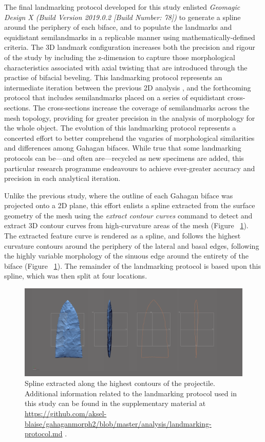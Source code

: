 \documentclass[review]{elsarticle}
\begin{document}
The final landmarking protocol developed for this study \citep{RN20850} enlisted \textit{Geomagic Design X (Build Version 2019.0.2 [Build Number: 78])} to generate a spline around the periphery of each biface, and to populate the landmarks and equidistant semilandmarks in a replicable manner using mathematically-defined criteria. The 3D landmark configuration increases both the precision and rigour of the study by including the z-dimension to capture those morphological characteristics associated with axial twisting that are introduced through the practise of bifacial beveling. This landmarking protocol represents an intermediate iteration between the previous 2D analysis \citep{RN11783}, and the forthcoming protocol that includes semilandmarks placed on a series of equidistant cross-sections. The cross-sections increase the coverage of semilandmarks across the mesh topology, providing for greater precision in the analysis of morphology for the whole object. The evolution of this landmarking protocol represents a concerted effort to better comprehend the vagaries of morphological similarities and differences among Gahagan bifaces. While true that some landmarking protocols can be—and often are—recycled as new specimens are added, this particular research programme endeavours to achieve ever-greater accuracy and precision in each analytical iteration.

Unlike the previous study, where the outline of each Gahagan biface was projected onto a 2D plane, this effort enlists a spline extracted from the surface geometry of the mesh using the \textit{extract contour curves} command to detect and extract 3D contour curves from high-curvature areas of the mesh (Figure ~\ref{fig:fig07}). The extracted feature curve is rendered as a spline, and follows the highest curvature contours around the periphery of the lateral and basal edges, following the highly variable morphology of the sinuous edge around the entirety of the biface (Figure ~\ref{fig:fig07}). The remainder of the landmarking protocol is based upon this spline, which was then split at four locations.

\begin{figure}[ht]\centering
\includegraphics[width=\linewidth]{fig07.png}
\caption{Spline extracted along the highest contours of the projectile. Additional information related to the landmarking protocol used in this study can be found in the supplementary material at \href{https://github.com/aksel-blaise/gahaganmorph2/blob/master/analysis/landmarking-protocol.md}{https://github.com/aksel-blaise/gahaganmorph2/blob/master/analysis/landmarking-protocol.md} \citep{RN20850}.}
\label{fig:fig07}
\end{figure}
\end{document}
